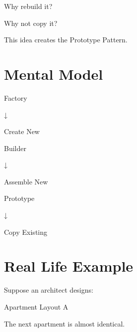 \documentclass[11pt,a4paper]{book}
\begin{document}
Why rebuild it?


Why not copy it?


This idea creates the
Prototype Pattern.


\section{Mental Model}

\begin{mentalmodel}

Factory

↓

Create New

\vspace{0.5em}

Builder

↓

Assemble New

\vspace{0.5em}

Prototype

↓

Copy Existing

\end{mentalmodel}


\section{Real Life Example}

Suppose an architect designs:


Apartment Layout A


The next apartment is almost
identical.

\end{document}
